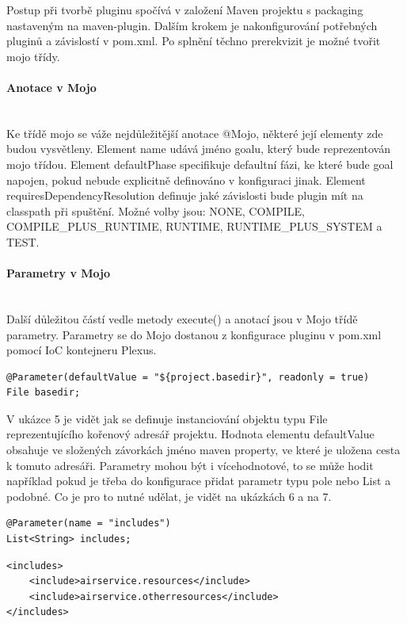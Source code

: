 \documentclass[11pt,twoside,a4paper]{book}
\begin{document}
Postup při tvorbě pluginu spočívá v založení Maven projektu s packaging nastaveným na
maven-plugin. Dalším krokem je nakonfigurování potřebných pluginů a závislostí v pom.xml.
Po splnění těchno prerekvizit je možné tvořit mojo třídy.

\paragraph{Anotace v Mojo}
\mbox{}\\

Ke třídě mojo se váže nejdůležitější anotace @Mojo, některé její elementy zde budou
vysvětleny. Element name udává jméno goalu, který bude reprezentován mojo třídou.
Element defaultPhase specifikuje defaultní fázi, ke které bude goal napojen, pokud nebude
explicitně definováno v konfiguraci jinak. Element requiresDependencyResolution definuje
jaké závislosti bude plugin mít na classpath při spuštění. Možné volby jsou: NONE,
COMPILE, COMPILE\_PLUS\_RUNTIME, RUNTIME, RUNTIME\_PLUS\_SYSTEM a
TEST.

\paragraph{Parametry v Mojo}
\mbox{}\\

Další důležitou částí vedle metody execute() a anotací jsou v Mojo třídě parametry. Parametry
se do Mojo dostanou z konfigurace pluginu v pom.xml pomocí IoC kontejneru Plexus.

\begin{lstlisting}[frame=single]
@Parameter(defaultValue = "${project.basedir}", readonly = true)
File basedir;
\end{lstlisting}

V ukázce 5 je vidět jak se definuje instanciování objektu typu File reprezentujícího kořenový
adresář projektu. Hodnota elementu defaultValue obsahuje ve složených závorkách jméno
maven property, ve které je uložena cesta k tomuto adresáři. Parametry mohou být i
vícehodnotové, to se může hodit například pokud je třeba do konfigurace přidat parametr typu
pole nebo List a podobné. Co je pro to nutné udělat, je vidět na ukázkách 6 a na 7.

\begin{lstlisting}[frame=single]
@Parameter(name = "includes")
List<String> includes;
\end{lstlisting}

\begin{lstlisting}[frame=single]
<includes>
    <include>airservice.resources</include>
    <include>airservice.otherresources</include>
</includes>
\end{lstlisting}
\end{document}
